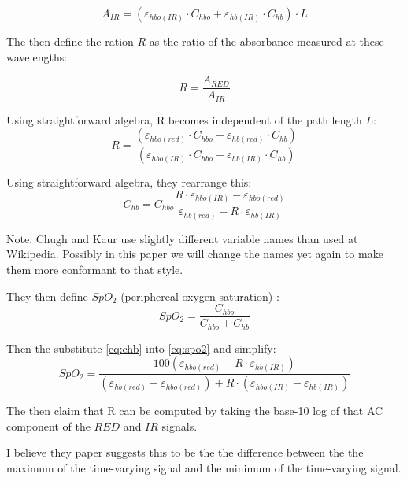 \documentclass[11pt]{article}
\begin{document}
\begin{equation}
  A_{IR} = (\varepsilon_{hbo(IR)}\cdot C_{hbo} + \varepsilon_{hb(IR)}\cdot C_{hb}) \cdot L
\end{equation}

The then define the ration $R$ as the ratio of the absorbance measured
at these wavelengths:

\begin{equation}
  R = \frac{A_{RED}}{A_{IR}}
  \end{equation}

Using straightforward algebra, R becomes independent of the path length $L$:
\begin{equation}
  R = \frac{(\varepsilon_{hbo(red)}\cdot C_{hbo} + \varepsilon_{hb(red)}\cdot C_{hb})}{(\varepsilon_{hbo(IR)}\cdot C_{hbo} + \varepsilon_{hb(IR)}\cdot C_{hb})}
\end{equation}

Using straightforward algebra, they rearrange this:
\begin{equation}
  \label{eq:chb}
  C_{hb} = C_{hbo} \frac{R \cdot \varepsilon_{hbo(IR)} - \varepsilon_{hbo(red)}}
  {\varepsilon_{hb(red)} - R \cdot \varepsilon_{hb(IR)} }
\end{equation}

Note: Chugh and Kaur use slightly different variable names than used at Wikipedia.
Possibly in this paper we will change the names yet again to make them more
conformant to that style.

They then define $SpO_2$ (periphereal oxygen saturation)
\cite{wiki:SpO2,wiki:oxygensaturation}:
\begin{equation}
  \label{eq:spo2}
  SpO_2 = \frac{C_{hbo}}{C_{hbo} + C_{hb}}
\end{equation}

Then the substitute \ref{eq:chb} into \ref{eq:spo2} and simplify:
\begin{equation}
  SpO_2 = \frac{100 (\varepsilon_{hbo(red)} - R \cdot \varepsilon_{hb(IR)})}
  {(\varepsilon_{hb(red)} - \varepsilon_{hbo(red)}) + R \cdot(\varepsilon_{hbo(IR)} - \varepsilon_{hb(IR)})}
\end{equation}

The then claim that R can be computed by taking the base-10 log of that AC 
component of the $RED$ and $IR$ signals.

I believe they paper suggests this to be the the difference between the the maximum
of the time-varying signal and the minimum of the time-varying signal.
\end{document}
